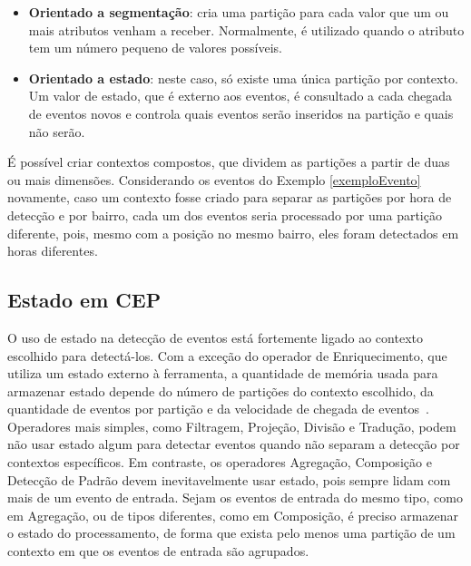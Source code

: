 \begin{itemize}
\begin{itemize}
\end{itemize}
\item \textbf{Orientado a segmentação}: %
cria uma partição para cada valor que um ou mais atributos venham a receber. Normalmente, é utilizado quando o atributo tem um número pequeno de valores possíveis.
\item \textbf{Orientado a estado}: neste caso, só existe uma única partição por contexto. Um valor de estado, que é externo aos eventos, é consultado a cada chegada de eventos novos e controla quais eventos serão inseridos na partição e quais não serão. 
\end{itemize}
É possível criar contextos compostos, que dividem as partições a partir de duas ou mais dimensões. Considerando os eventos do Exemplo \ref{exemploEvento} novamente, caso um contexto fosse criado para separar as partições por hora de detecção e por bairro, cada um dos eventos seria processado por uma partição diferente, pois, mesmo com a posição no mesmo bairro, eles foram detectados em horas diferentes. 

%

\subsection{Estado em CEP}
\label{sec:CEPstate}


O uso de estado na detecção de eventos está fortemente ligado ao contexto escolhido para detectá-los. Com a exceção do operador de Enriquecimento, que utiliza um estado externo à ferramenta, a quantidade de memória usada para armazenar estado depende do número de partições do contexto escolhido, da quantidade de eventos por partição e da velocidade de chegada de eventos~\citep{Etzion:2010:EPA:1894960}. Operadores mais simples, como Filtragem, Projeção, Divisão e Tradução, podem não usar estado algum para detectar eventos quando não separam a detecção por contextos específicos. Em contraste, os operadores Agregação, Composição e Detecção de Padrão devem inevitavelmente usar estado, pois sempre lidam com mais de um evento de entrada. Sejam os eventos de entrada do mesmo tipo, como em Agregação, ou de tipos diferentes, como em Composição, é preciso armazenar o estado do processamento, de forma que exista pelo menos uma partição de um contexto em que os eventos de entrada são agrupados. 

